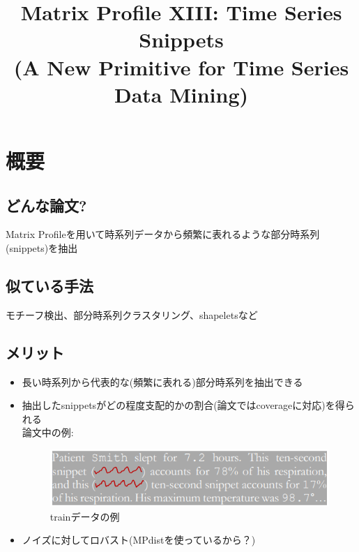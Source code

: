 \documentclass{jsarticle}
\begin{document}
\title{ Matrix Profile XIII: Time Series Snippets\\(A New Primitive for Time Series Data Mining)}
\author{}
\date{}
\maketitle

\section{概要}
\subsection{どんな論文?}
Matrix Profileを用いて時系列データから頻繁に表れるような部分時系列(snippets)を抽出

\subsection{似ている手法}
	モチーフ検出、部分時系列クラスタリング、shapeletsなど


\subsection{メリット}
\begin{itemize}
	\item 長い時系列から代表的な(頻繁に表れる)部分時系列を抽出できる
	\item 抽出したsnippetsがどの程度支配的かの割合(論文ではcoverageに対応)を得られる\\
	論文中の例:
	\begin{figure}[h]
		\begin{center}
			\includegraphics[scale = 0.7]{sleep_example.png}
		\end{center}
		\caption{trainデータの例}
		\label{fig:sleep_example}
	\end{figure}
	\item ノイズに対してロバスト(MPdistを使っているから？)
\end{itemize}

\newpage
\end{document}
